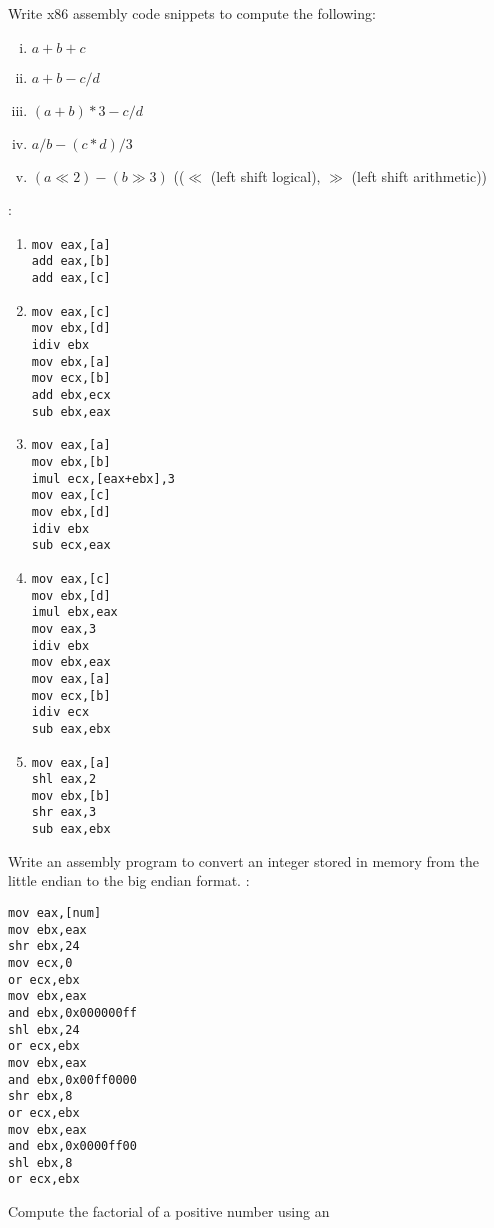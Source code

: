 \begin{ExerciseList}
\Exercise Write x86 assembly code snippets  to compute the following: 

\begin{enumerate}[i) ]
\item $a + b + c$
\item $a + b - c/d$
\item $(a + b)*3 - c/d$
\item $a/b - (c*d)/3$
\item $(a\ll2) - (b\gg 3)$ (($\ll$ (left shift logical), $\gg$ (left shift arithmetic))
\end{enumerate}
\Answer :

\begin{enumerate}
\item \begin{Verbatim}[frame=single]
mov eax,[a]
add eax,[b]
add eax,[c]
\end{Verbatim}
\item 
\begin{Verbatim}[frame=single]
mov eax,[c]
mov ebx,[d]
idiv ebx
mov ebx,[a]
mov ecx,[b]
add ebx,ecx
sub ebx,eax
\end{Verbatim}
\item
\begin{Verbatim}[frame=single]
mov eax,[a]
mov ebx,[b]
imul ecx,[eax+ebx],3
mov eax,[c]
mov ebx,[d]
idiv ebx
sub ecx,eax
\end{Verbatim}
\item 
\begin{Verbatim}[frame=single]
mov eax,[c]
mov ebx,[d]
imul ebx,eax
mov eax,3
idiv ebx
mov ebx,eax
mov eax,[a]
mov ecx,[b]
idiv ecx
sub eax,ebx
\end{Verbatim}
\item \begin{Verbatim}[frame=single]
mov eax,[a]
shl eax,2
mov ebx,[b]
shr eax,3
sub eax,ebx
\end{Verbatim}
\end{enumerate}
\Exercise
Write an assembly program to convert an integer stored in memory from the little endian to the big endian format.
\Answer:
\begin{Verbatim}[frame=single]
mov eax,[num]
mov ebx,eax
shr ebx,24
mov ecx,0
or ecx,ebx
mov ebx,eax
and ebx,0x000000ff
shl ebx,24
or ecx,ebx
mov ebx,eax
and ebx,0x00ff0000
shr ebx,8
or ecx,ebx
mov ebx,eax
and ebx,0x0000ff00
shl ebx,8
or ecx,ebx
\end{Verbatim}
\Exercise 
Compute the factorial of a positive number using an

\end{ExerciseList}
